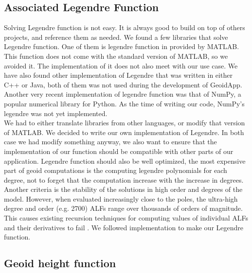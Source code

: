 \subsection{Associated Legendre Function}

Solving Legendre function is not easy. It is always good to build on top of others projects, and reference them as needed. We found a few libraries that solve Legendre function. One of them is legendre function in provided by MATLAB. This function does not come with the standard version of MATLAB, so we avoided it. The implementation of it does not also meet with our use case. We have also found other implementation of Legendre that was written in either C++ or Java, both of them was not used during the development of GeoidApp. Another very recent implementation of legendre function was that of NumPy, a popular numerical library for Python. As the time of writing our code, NumPy's legendre was not yet implemented.
\\
We had to either translate libraries from other languages, or modify that version of MATLAB. We decided to write our own implementation of Legendre. In both case we had modify something anyway, we also want to ensure that the implementation of our function should be compatible with other parts of our application. Legendre function should also be well optimized, the most expensive part of geoid computations is the computing legendre polynomials for each degree, not to forget that the computation increase with the increase in degrees. Another criteria is the stability of the solutions in high order and degrees of the model. However, when evaluated increasingly close to
the poles, the ultra-high degree and order (e.g. 2700)
ALFs range over thousands of orders of magnitude. This
causes existing recursion techniques for computing values
of individual ALFs and their derivatives to fail \cite{holmes}. We followed \cite{holmes} implementation to make our Legendre function.

 

\subsection{Geoid height function}

